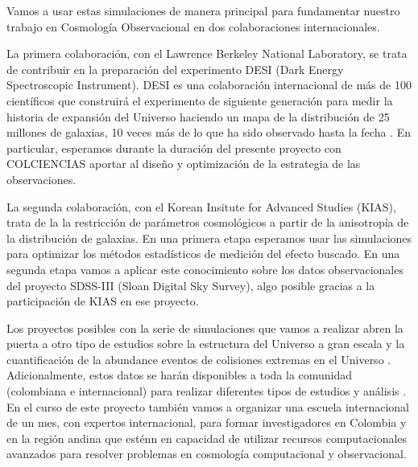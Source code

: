 Vamos a usar estas simulaciones de manera principal para fundamentar
nuestro trabajo en Cosmolog\'ia Observacional en dos colaboraciones
internacionales. 

La primera colaboraci\'on, con el Lawrence Berkeley National Laboratory,
se trata de contribuir en la preparaci\'on del experimento DESI (Dark
Energy Spectroscopic Instrument). 
DESI es una colaboraci\'on internacional de m\'as de 100 cient\'ificos
que construir\'a el experimento de siguiente generaci\'on para medir
la historia de expansi\'on del Universo haciendo un mapa de la
distribuci\'on de 25 millones de galaxias, 10 veces m\'as de lo que ha
sido observado hasta la fecha \cite{DESI2013}. 
En particular, esperamos durante la duraci\'on del presente proyecto
con COLCIENCIAS aportar al dise\~no y optimizaci\'on de la estrategia
de las observaciones.  

La segunda colaboraci\'on, con el Korean Insitute for Advanced Studies
(KIAS), trata de la la restricci\'on de par\'ametros cosmol\'ogicos a
partir de la anisotrop\'ia de la distribuci\'on de galaxias. 
En una primera etapa esperamos usar las simulaciones para optimizar los
m\'etodos estad\'isticos de medici\'on del efecto buscado. 
En una segunda etapa vamos a aplicar este conocimiento sobre los datos
observacionales del proyecto SDSS-III (Sloan Digital Sky Survey),
algo posible gracias a la participaci\'on de KIAS en ese proyecto.

Los proyectos posibles con la serie de simulaciones que vamos a
realizar abren la puerta a otro tipo de estudios sobre la estructura
del Universo a gran escala \cite{Tweb,Vweb} y la cuantificaci\'on de
la abundance eventos de colisiones extremas en el Universo
\cite{Bullets2010,Bullets2014}. 
Adicionalmente, estos datos se har\'an disponibles a toda la comunidad
(colombiana e internacional) para realizar diferentes tipos de
estudios y an\'alisis \cite{Multidark}.  
En el curso de este proyecto tambi\'en vamos a organizar una escuela
internacional de un mes, con expertos internacional, para formar
investigadores en Colombia y en la regi\'on andina que est\'enn en capacidad de
utilizar recursos computacionales avanzados para resolver problemas en
cosmolog\'ia computacional y observacional.
